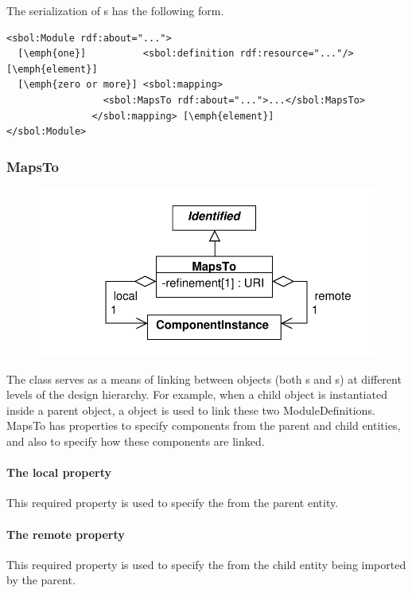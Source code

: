 The serialization of s has the following form.
\begin{lstlisting}
<sbol:Module rdf:about="...">
  [\emph{one}]          <sbol:definition rdf:resource="..."/>[\emph{element}]
  [\emph{zero or more}] <sbol:mapping>
                 <sbol:MapsTo rdf:about="...">...</sbol:MapsTo>
               </sbol:mapping> [\emph{element}]
</sbol:Module>
\end{lstlisting}

\subsubsection{MapsTo}
\label{sec:MapsTo}

\begin{figure}[ht]
\begin{center}
\includegraphics[scale=0.6]{uml/maps_to}
\caption[]{}
\label{uml:maps_to}
\end{center}
\end{figure}
The  class serves as a means of linking between  objects (both s and s) at different levels of the design hierarchy. For example, when a child  object is instantiated inside a parent  object, a  object is used to link these two ModuleDefinitions. MapsTo has properties to specify components from the parent and child entities, and also to specify how these components are linked.

\paragraph{The local property}
This required property is used to specify the  from the parent entity.

\paragraph{The remote property}
This required property is used to specify the  from the child entity being imported by the parent.

